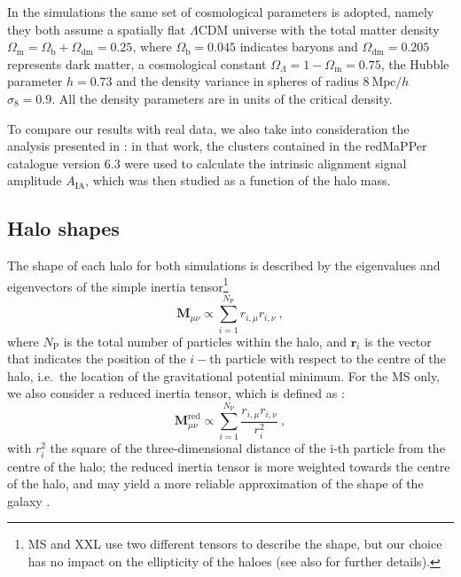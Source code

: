 \documentclass[a4paper,fleqn,usenatbib]{mnras}
\begin{document}
In the simulations the same set of cosmological parameters is adopted, namely they both assume a spatially flat $\Lambda$CDM universe with the total matter density $\Omega_{\mathrm{m}} = \Omega_{\mathrm{b}} + \Omega_{\mathrm{dm}} = 0.25$, where $\Omega _{\mathrm{b}} = 0.045$ indicates baryons and $\Omega_{\mathrm{dm}} = 0.205$ represents dark matter, a cosmological constant $\Omega_{\Lambda} = 1 - \Omega_{\mathrm{m}} = 0.75$, the Hubble parameter $h = 0.73$ and the density variance in spheres of radius $8 \ \mbox{Mpc}/h$ $\sigma_8 = 0.9$. All the density parameters are in units of the critical density.

To compare our results with real data, we also take into consideration the analysis presented in \citet{vanUitertJoachimi2017}: in that work, the clusters contained in the redMaPPer catalogue \citep{Rykoffetal2014} version 6.3 were used to calculate the intrinsic alignment signal amplitude $A_{\mathrm{IA}}$, which was then studied as a function of the halo mass. 

\subsection{Halo shapes}
\label{subsec:haloshapes}
The shape of each halo for both simulations is described by the eigenvalues and eigenvectors of the simple inertia tensor\footnote{MS and XXL use two different tensors to describe the shape, but our choice has no impact on the ellipticity of the haloes (see also \citet{Bettetal2007} for further details).}
\begin{equation}
    \mathbf{M}_{\mu \nu} \propto \sum_{i=1}^{N_{\mathrm{P}}} r_{i, \mu} r_{i, \nu} \ ,
	\label{eq:sit}
\end{equation}
where $N_{\mathrm{P}}$ is the total number of particles within the halo, and $\mathbf{r}_{i}$ is the vector that indicates the position of the $i-$th particle with respect to the centre of the halo, i.e.\ the location of the gravitational potential minimum. For the MS only, we also consider a reduced inertia tensor, which is defined as \citep{Pereiraetal2008}:
\begin{equation}
    \mathbf{M}_{\mu \nu}^{\mathrm{red}} \propto \sum _{i=1}^{N_{\mathrm{P}}} \frac{r_{i, \mu} r_{i, \nu}}{r_i^2} \ ,
	\label{eq:rit}
\end{equation}
with $r_i^2$ the square of the three-dimensional distance of the i-th particle from the centre of the halo; the reduced inertia tensor is more weighted towards the centre of the halo, and may yield a more reliable approximation of the shape of the galaxy \citep{Joachimietal2013b, Chisarietal2015}. 
\end{document}
